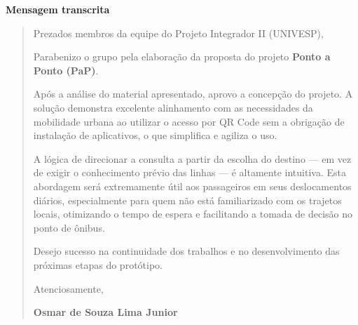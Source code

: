 \documentclass[12pt,oneside,a4paper,brazil,chapter=TITLE]{abntex2}
\begin{document}
\begin{anexosenv}
\medskip
\noindent\textbf{Mensagem transcrita}
\begin{quote}
Prezados membros da equipe do Projeto Integrador II (UNIVESP),

Parabenizo o grupo pela elaboração da proposta do projeto \textbf{Ponto a Ponto (PaP)}.

Após a análise do material apresentado, aprovo a concepção do projeto. A solução demonstra excelente alinhamento com as necessidades da mobilidade urbana ao utilizar o acesso por QR Code sem a obrigação de instalação de aplicativos, o que simplifica e agiliza o uso.

A lógica de direcionar a consulta a partir da escolha do destino — em vez de exigir o conhecimento prévio das linhas — é altamente intuitiva. Esta abordagem será extremamente útil aos passageiros em seus deslocamentos diários, especialmente para quem não está familiarizado com os trajetos locais, otimizando o tempo de espera e facilitando a tomada de decisão no ponto de ônibus.

Desejo sucesso na continuidade dos trabalhos e no desenvolvimento das próximas etapas do protótipo.

Atenciosamente,

\textbf{Osmar de Souza Lima Junior}
\end{quote}
\endgroup

\end{anexosenv}
\end{document}
